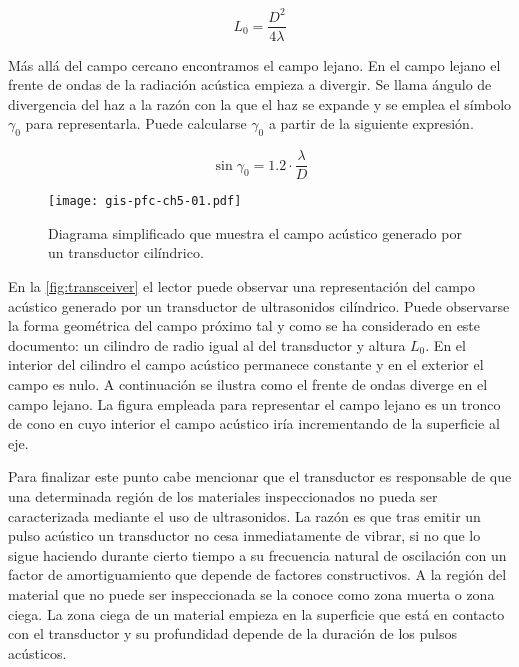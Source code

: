 \begin{equation}
	L_0 = \frac{D^2}{4\lambda}
	\label{eq:nearfield}
\end{equation}

Más allá del campo cercano encontramos el campo lejano. En el campo lejano
el frente de ondas de la radiación acústica empieza a divergir. Se llama
ángulo de divergencia del haz a la razón con la que el haz se expande y se
emplea el símbolo $\gamma_0$ para representarla. Puede calcularse
$\gamma_0$ a partir de la siguiente expresión.

\begin{equation}
	\sin{\gamma_0} = 1.2\cdot\frac{\lambda}{D}
	\label{eq:Adivergence}
\end{equation}

\begin{figure}
    \begin{center}
	\texttt{[image: gis-pfc-ch5-01.pdf]}
    \end{center}
    \caption[Campo acústico generado por un transductor cilíndrico]
    {Diagrama simplificado que muestra el campo acústico
    generado por un transductor cilíndrico.}
    \label{fig:transceiver}
\end{figure}

En la \vref{fig:transceiver} el lector puede observar una representación
del campo acústico generado por un transductor de ultrasonidos cilíndrico.
Puede observarse la forma geométrica del campo próximo tal y como se ha
considerado en este documento: un cilindro de radio igual al del
transductor y altura $L_0$. En el interior del cilindro el campo acústico
permanece constante y en el exterior el campo es nulo. A continuación se
ilustra como el frente de ondas diverge en el campo lejano. La figura
empleada para representar el campo lejano es un tronco de cono en cuyo
interior el campo acústico iría incrementando de la superficie al eje.

Para finalizar este punto cabe mencionar que el transductor es responsable
de que una determinada región de los materiales inspeccionados no pueda ser
caracterizada mediante el uso de ultrasonidos. La razón es que tras emitir
un pulso acústico un transductor no cesa inmediatamente de vibrar, si no
que lo sigue haciendo durante cierto tiempo a su frecuencia natural de
oscilación con un factor de amortiguamiento que depende de factores
constructivos. A la región del material que no puede ser inspeccionada se
la conoce como zona muerta o zona ciega. La zona ciega de un material
empieza en la superficie que está en contacto con el transductor y su
profundidad depende de la duración de los pulsos acústicos.



